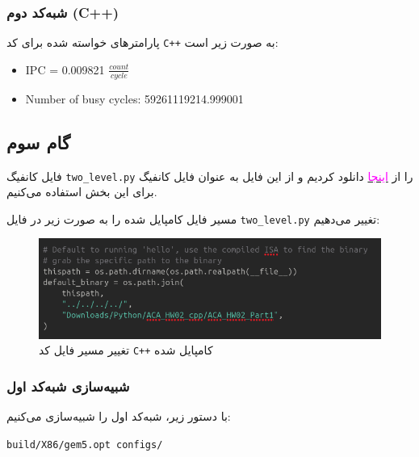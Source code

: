 \documentclass[12pt]{exam}
\begin{document}
\begin{multicols}{1}
	  \subsubsection{شبه‌کد دوم (C++)}
	  پارامتر‌های خواسته شده برای کد \texttt{C++} به صورت زیر است:
	  \begin{latin}
	  	\begin{itemize}
	  		\item IPC = 0.009821 $\frac{count}{cycle}$
	  		\item Number of busy cycles: 59261119214.999001
	  	\end{itemize}
	  \end{latin}
	  
	  
	  
	  
	  
	  
	  
	  
	  \subsection{گام سوم}
	  
	  فایل کانفیگ \texttt{two\_level.py} را از \href{https://github.com/gem5/gem5/blob/stable/configs/learning_gem5/part1/two_level.py}{\textcolor{magenta}{اینجا}} دانلود کردیم و از این فایل به عنوان فایل کانفیگ برای این بخش استفاده می‌کنیم.
	  
	   مسیر فایل کامپایل شده را به صورت زیر در فایل \texttt{two\_level.py} تغییر می‌دهیم:
	  \begin{center}
	  	\begin{figure}[H]
	  		\includegraphics[scale=0.35]{images/img8.png}
	  		\caption{تغییر مسیر فایل کد \texttt{C++} کامپایل شده}
	  		\label{تغییر مسیر فایل}
	  	\end{figure}
	  \end{center}
	  
	  \subsubsection{شبیه‌سازی شبه‌کد اول}
	  با دستور زیر، شبه‌کد اول را شبیه‌سازی می‌کنیم:
	  
	  \begin{latin}
	  	\texttt{build/X86/gem5.opt configs/}
	  	

\end{latin}
\end{multicols}
\end{document}
